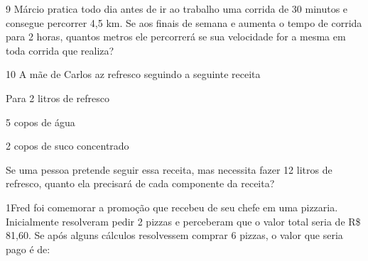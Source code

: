 
\num{9} Márcio pratica todo dia antes de ir ao trabalho uma corrida de 30
minutos e consegue percorrer 4,5 km. Se aos finais de semana e aumenta o
tempo de corrida para 2 horas, quantos metros ele percorrerá se sua
velocidade for a mesma em toda corrida que realiza?



\num{10} A mãe de Carlos az refresco seguindo a seguinte receita

Para 2 litros de refresco

5 copos de água

2 copos de suco concentrado


Se uma pessoa pretende seguir essa receita, mas necessita fazer 12
litros de refresco, quanto ela precisará de cada componente da receita?




\num{1}Fred foi comemorar a promoção que recebeu de seu chefe em uma
pizzaria. Inicialmente resolveram pedir 2 pizzas e perceberam que o
valor total seria de R\$ 81,60. Se após alguns cálculos resolvessem
comprar 6 pizzas, o valor que seria pago é de:


